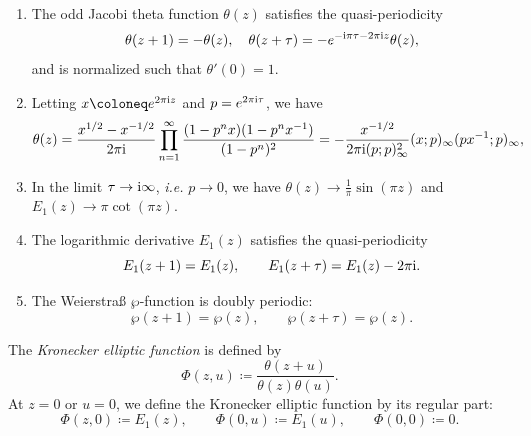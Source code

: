 \begin{lemma}
	\begin{enumerate}[label=(\roman*)]
		\item The odd Jacobi theta function $\theta(z)$ satisfies the quasi-periodicity
		\begin{equation}
		    \theta(z+1) = -\theta(z), \quad \theta(z+\tau) = -e^{-\mathrm{i}\pi \tau - 2\pi \mathrm{i} z} \theta(z),
		\end{equation}
		and is normalized such that $\theta'(0) = 1$.
		\item Letting $x \coloneq e^{2\pi\I z}$ and $p=e^{2\pi\mathrm{i}\tau}$, we have
		\begin{equation}
			\theta(z) = \frac{x^{1/2}-x^{-1/2}}{2\pi\mathrm{i}} \prod_{n=1}^\infty \frac{(1-p^n x) (1-p^n x^{-1})}{(1-p^n)^2} = -\frac{x^{-1/2}}{2\pi\mathrm{i} (p;p)_\infty^2} (x;p)_\infty (px^{-1};p)_\infty,
		\end{equation}
		\item In the limit $\tau \to \mathrm{i}\infty$, \emph{i.e.} $p \to 0$, we have $\theta(z) \to \frac{1}{\pi} \sin(\pi z)$ and $E_1(z) \to \pi \cot(\pi z)$.
		\item The logarithmic derivative $E_1(z)$ satisfies the quasi-periodicity
		\begin{equation}
			E_1(z+1) = E_1(z), \qquad E_1(z+\tau) = E_1(z) - 2\pi\mathrm{i}.
		\end{equation}
		\item The Weierstraß $\wp$-function is doubly periodic:
		\begin{equation}
			\wp(z+1) = \wp(z), \qquad \wp(z+\tau) = \wp(z).
		\end{equation}
	\end{enumerate}
\end{lemma}

\begin{definition}
	The \emph{Kronecker elliptic function} is defined by
	\begin{equation}\label{eq:kronecker}
    	\Phi(z,u) \coloneq \frac{\theta(z+u)}{\theta(z) \theta(u)}.
	\end{equation}
	At $z=0$ or $u=0$, we define the Kronecker elliptic function by its regular part:
	\begin{equation}
		\Phi(z,0) \coloneq E_1(z), \qquad \Phi(0,u) \coloneq E_1(u), \qquad \Phi(0,0) \coloneq 0.
	\end{equation}
\end{definition}

